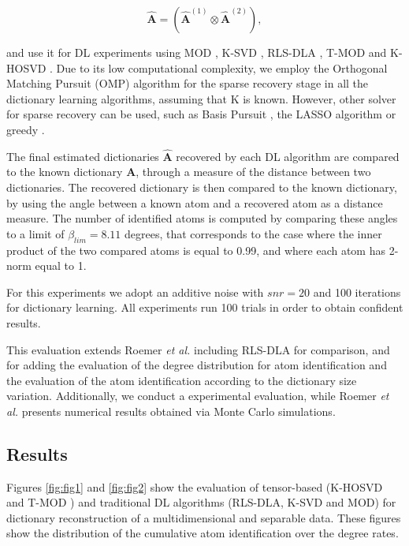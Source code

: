 \begin{equation}\label{eq:4_eq04}
	\boldsymbol{\hat{A}} = (\boldsymbol{\hat{A}}^{(1)} \otimes \boldsymbol{\hat{A}}^{(2)}),
\end{equation}

and use it for DL experiments using MOD \cite{engan1999method}, K-SVD \cite{aharon2006rm}, RLS-DLA \cite{skretting2010recursive}, T-MOD \cite{roemer2014tensor} and K-HOSVD \cite{roemer2014tensor}. Due to its low computational complexity, we employ the Orthogonal Matching Pursuit (OMP) algorithm\cite{davis1997adaptive} for the sparse recovery stage in all the dictionary learning algorithms, assuming that K is known. However, other solver for sparse recovery can be used, such as Basis Pursuit \cite{chen2001atomic}, the LASSO algorithm \cite{tibshirani1996regression} or greedy \cite{davis1997adaptive}.

The final estimated dictionaries $\boldsymbol{\hat{A}}$ recovered by each DL algorithm are compared to the known dictionary $\boldsymbol{A}$, through a measure of the distance between two dictionaries. The recovered dictionary is then compared to the known dictionary, by using the angle between a known atom and a recovered atom as a distance measure. The number of identified atoms is computed by comparing these angles to a limit of $\beta_{lim} = 8.11$ degrees, that corresponds to the case where the inner product of the two compared atoms is equal to 0.99, and where each atom has 2-norm equal to 1.

For this experiments we adopt an additive noise with $snr = 20$ and 100 iterations for dictionary learning. All experiments run 100 trials in order to obtain confident results.

This evaluation extends Roemer \emph{et al.} \cite{roemer2014tensor} including RLS-DLA for comparison, and for adding the evaluation of the degree distribution for atom identification and the evaluation of the atom identification according to the dictionary size variation. Additionally, we conduct a experimental evaluation, while Roemer \emph{et al.} \cite{roemer2014tensor} presents numerical results obtained via Monte Carlo simulations.


\subsection{Results}
\label{sec:4_motivation_results}

Figures \ref{fig:fig1} and \ref{fig:fig2} show the evaluation of tensor-based (K-HOSVD \cite{roemer2014tensor} and T-MOD \cite{roemer2014tensor}) and traditional DL algorithms (RLS-DLA, K-SVD and MOD) for dictionary reconstruction of a multidimensional and separable data. These figures show the distribution of the cumulative atom identification over the degree rates.

